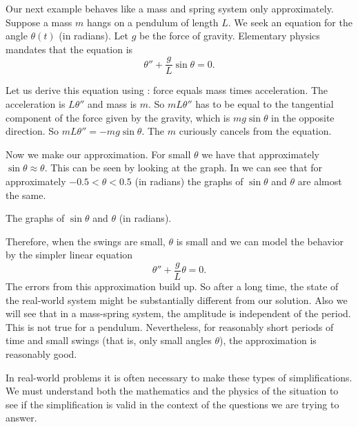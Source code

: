 \medskip

\begin{mywrapfigsimp}[10]{1.8in}{2.16in}
\noindent
{}
\end{mywrapfigsimp}
Our next example behaves like a mass and spring system only
approximately. Suppose a
mass $m$ hangs on a pendulum of length $L$.  We seek an equation for
the angle $\theta(t)$ (in radians).  Let $g$ be the force of gravity.
Elementary physics mandates that the equation is
\begin{equation*}
\theta'' + \frac{g}{L} \sin \theta = 0 .
\end{equation*}

Let us derive this equation using :
force equals mass times acceleration.  The acceleration is
$L \theta''$ and mass is $m$.  So $mL\theta''$ has to be equal
to the tangential component of the force given by the gravity, which is
$m g \sin \theta$ in the opposite direction.
So $mL\theta'' = -mg \sin \theta$.
The $m$ curiously cancels from the equation.

Now we make our approximation.  For small $\theta$ we have that approximately
$\sin \theta \approx \theta$.  This can be seen by looking at the graph.
In  we can see that for approximately
$-0.5 < \theta < 0.5$ (in radians) the graphs of $\sin \theta$ and $\theta$ are almost the
same.

\begin{mywrapfig}{3.25in}
\capstart
{}
\caption{The graphs of $\sin \theta$ and $\theta$ (in radians).\label{mv:sinthetafig}}
\end{mywrapfig}

Therefore, when the swings are small, $\theta$ is small and we can
model the behavior by the simpler linear equation
\begin{equation*}
\theta'' + \frac{g}{L} \theta = 0 .
\end{equation*}
The errors from this approximation build up.
So after a
long time, the state of the real-world system might be substantially
different from our solution.  Also we will
see that in a mass-spring system, the amplitude is independent of the
period.
This is not true for a pendulum.  Nevertheless, for reasonably short periods of time
and small swings (that is, only small angles $\theta$),
the approximation is reasonably good.

In real-world problems it is often necessary to make these types of
simplifications.  We must understand both the mathematics and
the physics of the situation to see if the simplification is valid in the
context of the questions we are trying to answer.

